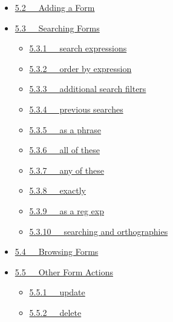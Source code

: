 \documentclass[letterpaper,10pt,english]{sphinxmanual}
\begin{document}
{\begin{minipage}{0.95\linewidth}
\begin{itemize}
\begin{itemize}
\begin{itemize}
\end{itemize}

\item {} 
{\hyperref[user_guide:adding-a-form]{5.2   Adding a Form}}

\item {} 
{\hyperref[user_guide:searching-forms]{5.3   Searching Forms}}
\begin{itemize}
\item {} 
{\hyperref[user_guide:search-expressions]{5.3.1   search expressions}}

\item {} 
{\hyperref[user_guide:order-by-expression]{5.3.2   order by expression}}

\item {} 
{\hyperref[user_guide:additional-search-filters]{5.3.3   additional search filters}}

\item {} 
{\hyperref[user_guide:previous-searches]{5.3.4   previous searches}}

\item {} 
{\hyperref[user_guide:as-a-phrase]{5.3.5   as a phrase}}

\item {} 
{\hyperref[user_guide:all-of-these]{5.3.6   all of these}}

\item {} 
{\hyperref[user_guide:any-of-these]{5.3.7   any of these}}

\item {} 
{\hyperref[user_guide:exactly]{5.3.8   exactly}}

\item {} 
{\hyperref[user_guide:as-a-reg-exp]{5.3.9   as a reg exp}}

\item {} 
{\hyperref[user_guide:searching-and-orthographies]{5.3.10   searching and orthographies}}

\end{itemize}

\item {} 
{\hyperref[user_guide:browsing-forms]{5.4   Browsing Forms}}

\item {} 
{\hyperref[user_guide:other-form-actions]{5.5   Other Form Actions}}
\begin{itemize}
\item {} 
{\hyperref[user_guide:update]{5.5.1   update}}

\item {} 
{\hyperref[user_guide:delete]{5.5.2   delete}}


\end{itemize}
\end{itemize}
\end{itemize}
\end{minipage}}
\end{document}
